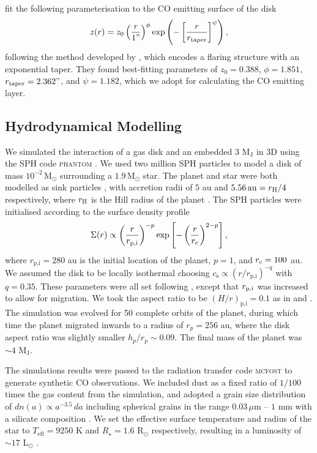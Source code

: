 \citet{law2021a} fit the following parameterisation to the CO emitting surface of the disk
\begin{align}
    z(r) = z_0 \left( \frac{r}{1"} \right)^\phi \exp \left( -\left[ \frac{r}{r_\mathrm{taper}} \right]^{\psi} \right), \label{eq:height}
\end{align}
following the method developed by \citet{pinte2018}, which encodes a flaring structure with an exponential taper.
They found best-fitting parameters of $z_0 = 0.388$, $\phi = 1.851$, $r_\textrm{taper} = 2.362"$, and $\psi = 1.182$, which we adopt for calculating the CO emitting layer.

\subsection{Hydrodynamical Modelling} \label{sec:calcino_hydro}

We simulated the interaction of a gas disk and an embedded 3 M$_\textrm{J}$ in 3D using the SPH code \textsc{phantom} \citep{price2018}.
We used two million SPH particles to model a disk of mass $10^{-2} \, \mathrm{M_\odot}$ surrounding a $1.9 \, \mathrm{M_\odot}$ star.
The planet and star were both modelled as sink particles \citep{bate1995}, with accretion radii of $5$ au and $5.56 \, \mathrm{au} = r_{\rm H}/4$ respectively, where $r_{\rm H}$ is the Hill radius of the planet \citep{hill1878}.
The SPH particles were initialised according to the surface density profile
\begin{align}
    \Sigma (r) \propto \left(\frac{r}{r_\mathrm{p,i}}\right)^{-p} \exp \left[-\left(\frac{r}{r_{\rm c}}\right)^{2-p}\right], \label{eq:sigma_phantom}
\end{align}
where $r_\textrm{p,i} = 280$ au is the initial location of the planet, $p = 1$, and  $r_{\rm c} = 100 $ au.
We assumed the disk to be locally isothermal choosing $c_\textrm{s} \propto (r/r_\textrm{p,i})^{-q}$ with $q = 0.35$.
These parameters were all set following \citet{pinte2018a}, except that $r_{\rm p,i}$ was increased to allow for migration.
We took the aspect ratio to be $(H/r)_{\textrm{p,i}} = 0.1$ as in \citet{degregorio-monsalvo2013} and \citet{pinte2018a}.
The simulation was evolved for 50 complete orbits of the planet, during which time the planet migrated inwards to a radius of $r_p = 256$ au, where the disk aspect ratio was slightly smaller $h_p/r_p \sim 0.09$.
The final mass of the planet was $\sim 4$ $\mathrm{M_J}$.

The simulations results were passed to the radiation transfer code \textsc{mcfost} \citep{pinte2006,pinte2009} to generate synthetic CO observations.
We included dust as a fixed ratio of $1/100$ times the gas content from the simulation, and adopted a grain size distribution of $dn(a) \propto a^{-3.5} \, da$ including spherical grains in the range  $0.03 \, \mu$m -- $1$ mm with a silicate composition \citep{weingartner2001}.
We set the effective surface temperature and radius of the star to $T_\textrm{eff} = 9250$ K and $R_\star = 1.6 $ $\mathrm{R_\odot}$ respectively, resulting in a luminosity of $\sim 17$ L$_\odot$ \citep{setterholm2018}.

